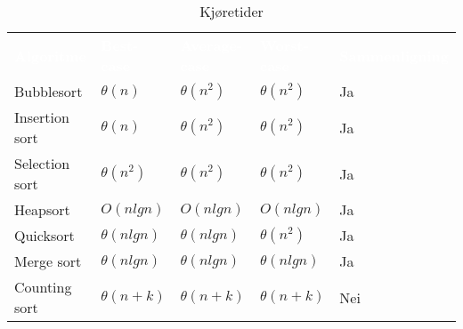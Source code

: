 \begin{table}[H]
    \caption{Kjøretider}
    \label{tab:kjoretider}
    \centering
    \begin{tabular}{|L{8em} | L{8em}|L{8em}| L{8em}|L{8em}|}
        \hline
        \textbf{\textcolor{white}{Algoritme}} & \textbf{\textcolor{white}{Best-case}} & \textbf{\textcolor{white}{Average-case}} & \textbf{\textcolor{white}{Worst-case}} & \textbf{\textcolor{white}{Sammenligning}}\\
        Bubblesort & $\theta(n)$ & $\theta(n^2)$ & $\theta(n^2)$ & Ja\\
        Insertion sort & $\theta(n)$ & $\theta(n^2)$ & $\theta(n^2)$ & Ja\\
        Selection sort & $\theta(n^2)$ & $\theta(n^2)$ & $\theta(n^2)$ & Ja\\
        Heapsort & $O(n lg n)$ & $O(n lg n)$ & $O(n lg n)$ & Ja\\
        Quicksort & $\theta(n lg n)$ & $\theta(n lg n)$ & $\theta(n^2)$ & Ja\\
        Merge sort & $\theta(n lg n)$ & $\theta(n lg n)$ & $\theta(n lg n)$ & Ja\\
        Counting sort & $\theta(n + k)$ & $\theta(n + k)$ & $\theta(n + k)$ & Nei\\
         \hline
    \end{tabular}
\end{table}